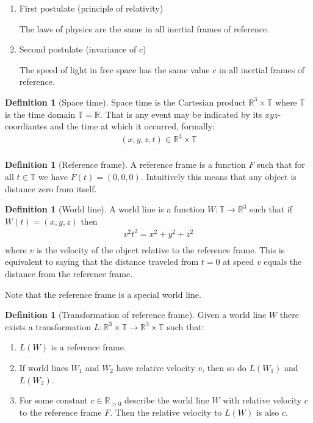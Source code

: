 \documentclass[a4paper,11pt]{article}
\theoremstyle{plain}
\theoremstyle{definition}
\newtheorem{definition}[theorem]{Definition}
\newcommand{\R}{\mathbb{R}}
\begin{document}
\newpage
\begin{enumerate}
	\item First postulate (principle of relativity)

		The laws of physics are the same in all inertial frames of reference.
	\item Second postulate (invariance of $c$)

		The speed of light in free space has the same value $c$
		in all inertial frames of reference.
\end{enumerate}
\begin{definition}[Space time]
	Space time is the Cartesian product $\R^3\times \mathbb{T}$ where
	$\mathbb{T}$ is the time domain $\mathbb{T}=\R$. That is any event may be
	indicated by its $xyz$-coordiantes and the time at which it occurred,
	formally:
	\begin{align*}
		(x,y,z,t)\in\R^3 \times \mathbb{T}\\
	\end{align*}
\end{definition}
\begin{definition}[Reference frame]
	A reference frame is a function $F$ such that for all $t\in\mathbb{T}$ we
	have $F(t)=(0,0,0)$. Intuitively this means that any object is distance zero
	from itself.
\end{definition}
\begin{definition}[World line]
	A world line is a function $W:\mathbb{T}\rightarrow \R^3$ such that if
	$W(t)=(x,y,z)$ then
	\begin{align*}
	v^2 t^2=x^2+y^2+z^2 \\
	\end{align*}
	where $v$ is the velocity of the object relative to the reference
	frame. This is equivalent to saying that the distance traveled
	from $t=0$ at speed $v$ equals the distance from the reference frame.
\end{definition}
Note that the reference frame is a special world line.
\begin{definition}[Transformation of reference frame]
	Given a world line $W$ there exists a transformation $L:
	\R^3\times\mathbb{T}\rightarrow\R^3\times\mathbb{T}$ 
	such that:
	\begin{enumerate}
		\item $L(W)$ is a reference frame.
		\item If world lines $W_1$ and $W_2$ have relative velocity $v$, then so
			do $L(W_1)$ and $L(W_2)$.
		\item For some constant $c\in\R_{>0}$ describe the world line $W$ with
			relative velocity $c$ to the reference frame $F$. Then the relative
			velocity to $L(W)$ is also $c$.
	\end{enumerate}
\end{definition}
\end{document}
